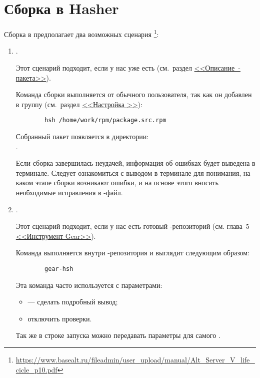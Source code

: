 \section{Сборка в Hasher}
Сборка в  предполагает два возможных сценария%
\footnote{\href{https://www.basealt.ru/fileadmin/user_upload/manual/Alt_Server_V_life_cicle_p10.pdf}{https://www.basealt.ru/fileadmin/user\_upload/manual/Alt\_Server\_V\_life\_cicle\_p10.pdf}}: 
\begin{enumerate}
	\item {}.
	
		Этот сценарий подходит, если у нас уже есть  (см.~раздел %
		\hyperlink{3.1}{\mbox{<<Описание -пакета>>}}).
	
	Команда сборки выполняется от обычного пользователя, так как он добавлен в группу  
		(см.~раздел %
		\hyperlink{5.3}{<<Настройка >>}): 
	\begin{verbatim}
		hsh /home/work/rpm/package.src.rpm
	\end{verbatim}
	Собранный пакет появляется в директории:\\ . 
	
	Если сборка завершилась неудачей, информация об ошибках будет выведена в терминале. Следует ознакомиться 
		с выводом в терминале для понимания, на каком этапе сборки возникают ошибки, и на основе этого 
		вносить необходимые исправления в -файл.
	
	\item  {}.
	
	Этот сценарий подходит, если у нас есть готовый -репозиторий (см. глава~5 
		\hyperlink{4}{<<Инструмент Gear>>}).
	
	 Команда выполняется внутри -репозитория и выглядит следующим образом:
	 \begin{verbatim}
	 	gear-hsh
	 \end{verbatim}
	 
	 Эта команда часто используется с параметрами: 
	 \begin{itemize}
	 	\item {} --- сделать подробный вывод;
	 	\item {} отключить проверки.
	 \end{itemize}
	 Так же в строке запуска  можно передавать параметры для самого . 
\end{enumerate}

